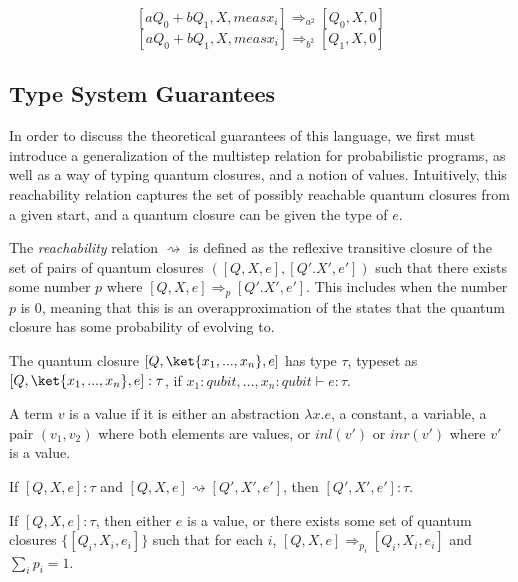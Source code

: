 \[
    [aQ_0+bQ_1, X, meas x_i] \Rightarrow_{a^2} [Q_0,X,0]
\]
\[
    [aQ_0+bQ_1, X, meas x_i] \Rightarrow_{b^2} [Q_1,X,0]
\]
\subsection{Type System Guarantees}
In order to discuss the theoretical guarantees of this language, we first must introduce a generalization of the multistep relation for probabilistic programs, as well as a way of typing quantum closures, and a notion of values.
Intuitively, this reachability relation captures the set of possibly reachable quantum closures from a given start, and a quantum closure can be given the type of $e$.
\begin{definition}
The \textit{reachability} relation $\rightsquigarrow$ is defined as the reflexive transitive closure of the set of pairs of quantum closures $([Q,X,e], [Q'.X',e'])$ such that there exists some number $p$ where $[Q,X,e]\Rightarrow_p [Q'.X',e']$.
This includes when the number $p$ is 0, meaning that this is an overapproximation of the states that the quantum closure has some probability of evolving to.
\end{definition}
\begin{definition}
    The quantum closure $[Q, \ket{x_1,...,x_n}, e]$ has type $\tau$, typeset as $[Q, \ket{x_1,...,x_n}, e]:\tau$, if $x_1 : qubit, ..., x_n : qubit \vdash e : \tau$.
\end{definition}
\begin{definition}
    A term $v$ is a value if it is either an abstraction $\lambda x. e$, a constant, a variable, a pair $(v_1,v_2)$ where both elements are values, or $inl(v')$ or $inr(v')$  where $v'$ is a value.
\end{definition}
\begin{theorem}[Preservation]
    If $[Q,X,e] : \tau$ and $[Q,X,e] \rightsquigarrow [Q',X',e']$, then $[Q',X',e'] : \tau$.
\end{theorem}
\begin{theorem}[Progress]
    If $[Q,X,e] : \tau$, then either $e$ is a value, or there exists some set of quantum closures $\{[Q_i,X_i,e_i]\}$ such that for each $i$, $[Q,X,e]\Rightarrow_{p_i}[Q_i,X_i,e_i]$ and $\sum_{i}p_i=1$.
\end{theorem}